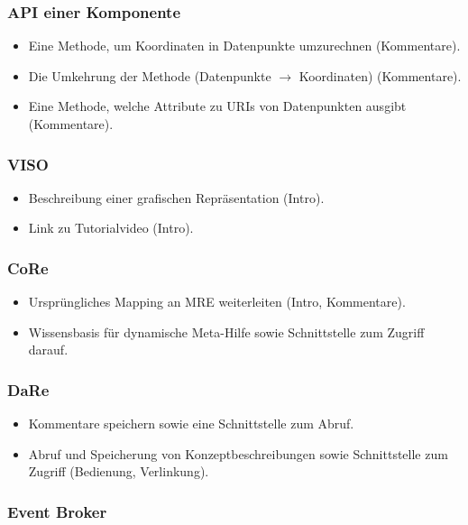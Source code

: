 \documentclass[
	headsepline,
	footsepline,
	fontsize=12pt,
	bibliography=totoc
]{scrbook}
\begin{document}
\subsubsection{API einer Komponente}

\begin{itemize}
	\item Eine Methode, um Koordinaten in Datenpunkte umzurechnen (Kommentare).
	\item Die Umkehrung der Methode (Datenpunkte $\to$ Koordinaten) (Kommentare).
	\item Eine Methode, welche Attribute zu URIs von Datenpunkten ausgibt (Kommentare).
\end{itemize}

\subsubsection{VISO}

\begin{itemize}
	\item Beschreibung einer grafischen Repräsentation (Intro).
	\item Link zu Tutorialvideo (Intro).
\end{itemize}

\subsubsection{CoRe}

\begin{itemize}
	\item Ursprüngliches Mapping an MRE weiterleiten (Intro, Kommentare).
	\item Wissensbasis für dynamische Meta-Hilfe sowie Schnittstelle zum Zugriff darauf.
\end{itemize}

\subsubsection{DaRe}

\begin{itemize}
	\item Kommentare speichern sowie eine Schnittstelle zum Abruf.
	\item Abruf und Speicherung von Konzeptbeschreibungen sowie Schnittstelle zum Zugriff (Bedienung, Verlinkung).
\end{itemize}

\subsubsection{Event Broker}
\end{document}
